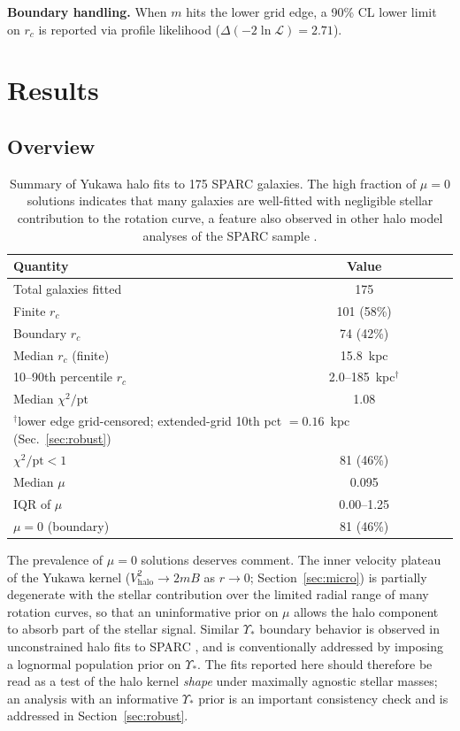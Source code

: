 \documentclass[11pt,a4paper]{article}
\begin{document}
\textbf{Boundary handling.}
When $m$ hits the lower grid edge, a 90\% CL lower limit on $r_c$
is reported via profile likelihood
($\Delta(-2\ln\mathcal{L}) = 2.71$).


\section{Results}
\label{sec:results}

\subsection{Overview}

\begin{table}[h]
\centering
\begin{tabular}{lc}
\toprule
Quantity & Value \\
\midrule
Total galaxies fitted & 175 \\
Finite $r_c$ & 101 (58\%) \\
Boundary $r_c$ & 74 (42\%) \\
Median $r_c$ (finite) & 15.8~kpc \\
10--90th percentile $r_c$ & 2.0--185~kpc$^{\dagger}$ \\
Median $\chi^2/\mathrm{pt}$ & 1.08 \\
\multicolumn{2}{l}{\footnotesize $^{\dagger}$lower edge grid-censored;
extended-grid 10th pct $= 0.16$~kpc (Sec.~\ref{sec:robust})} \\
$\chi^2/\mathrm{pt} < 1$ & 81 (46\%) \\
\midrule
Median $\mu$ & 0.095 \\
IQR of $\mu$ & 0.00--1.25 \\
$\mu = 0$ (boundary) & 81 (46\%) \\
\bottomrule
\end{tabular}
\caption{Summary of Yukawa halo fits to 175 SPARC galaxies.
The high fraction of $\mu = 0$ solutions indicates that many
galaxies are well-fitted with negligible stellar contribution
to the rotation curve, a feature also observed in other halo
model analyses of the SPARC sample \cite{Li:2020iib}.}
\label{tab:overview}
\end{table}

The prevalence of $\mu = 0$ solutions deserves comment.
The inner velocity plateau of the Yukawa kernel
($V_{\mathrm{halo}}^2 \to 2mB$ as $r \to 0$;
Section~\ref{sec:micro}) is partially degenerate with the stellar
contribution over the limited radial range of many rotation
curves, so that an uninformative prior on $\mu$ allows the halo
component to absorb part of the stellar signal.
Similar $\Upsilon_*$ boundary behavior is observed in
unconstrained halo fits to SPARC
\cite{Li:2020iib}, and is conventionally addressed by imposing
a lognormal population prior on $\Upsilon_*$.
The fits reported here should therefore be read as a test of the
halo kernel \emph{shape} under maximally agnostic stellar
masses; an analysis with an informative $\Upsilon_*$ prior is an
important consistency check and is addressed in
Section~\ref{sec:robust}.
\end{document}
